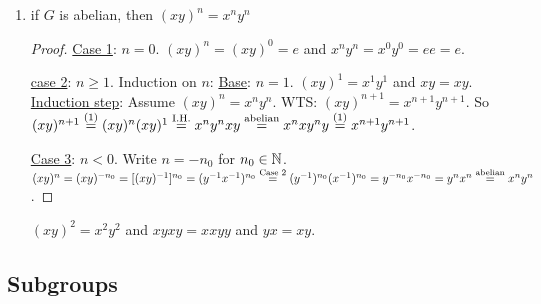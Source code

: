 \documentclass[]{article}
\begin{document}
\begin{theorem}
\begin{enumerate}
\begin{proof}
				\ul{Case 2}: $m<0$ and $n<0$. Write $m=-m_0$ and $n = -n_0$ for $m_0,n_0\in\mb N$. $(x^m)^n = (x^{-m_0})^{-n_0} = [(x\inv)^{m_0}]^{-n_0} = \{[(x\inv)^{m_0}]\inv\}^{n_0} = \{[(x\inv)\inv]^{m_0}\}^{n_0} = (x^{m_0})^{n_0} \os{\text{Case 1}}{=} x^{m_0n_0} = x^{mn}$.

				\ul{Case 3}: $m<0$ and $n\geq 0$. Write $m=-m_0$ for $m_0\in\mb N$. $(x^m)^n = (x^{-m_0})^n = [(x\inv)^{m_0}]^n \os{\text{Case 1}}{=} (x\inv)^{m_0n} = x^{-m_0n} = x^{mn}$.

				\ul{Case 4}: $m\geq 0$ and $n<0$. Write $n = -n_0$ for $n_0\in\mb N$. $(x^m)^n = (x^m)^{-n_0} = [(x^m)\inv]^{n_0} = [(x\inv)^m]^{n_0} = (x\inv)^{mn_0} = x^{-mn_0} = x^{mn}$.
			\end{proof}
		\item if $G$ is abelian, then $(xy)^n = x^ny^n$
			\begin{proof}
				\ul{Case 1}: $n=0$. $(xy)^n = (xy)^0 = e$ and $x^ny^n = x^0 y^0 = ee = e$.

				\ul{case 2}: $n\geq 1$. Induction on $n$: \ul{Base}: $n=1$. $(xy)^1 = x^1 y^1$ and $xy = xy$. \ul{Induction step}: Assume $(xy)^n = x^n y^n$. WTS: $(xy)^{n+1} = x^{n+1} y^{n+1}$. So $(xy)^{n+1} \overset{(1)}{=} (xy)^n(xy)^1 \overset{\text{I.H.}}{=} x^n y^n xy \overset{\text{abelian}}{=} x^n x y^n y \overset{(1)}{=} x^{n+1}y^{n+1}$.

				\ul{Case 3}: $n<0$. Write $n=-n_0$ for $n_0\in\mb N$. $(xy)^n = (xy)^{-n_0} = [(xy)^{-1}]^{n_0} = (y^{-1} x^{-1})^{n_0} \overset{\text{Case 2}}{=} (y^{-1})^{n_0}(x^{-1})^{n_0} = y^{-n_0} x^{-n_0} = y^nx^n \overset{\text{abelian}}{=} x^ny^n$.
			\end{proof}
			\begin{example}
				$(xy)^2 = x^2 y^2$ and $xyxy = xxyy$ and $yx = xy$.
			\end{example}
	\end{enumerate}
\end{theorem}

\subsection{Subgroups}
\end{document}
